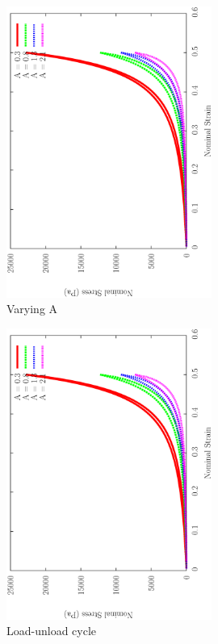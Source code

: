 \begin{figure}[!hpt]
\centering
\includegraphics[angle=270,width=0.6\textwidth]{images/examples/lagrangian/cyclic/parametric-study}
\caption{Varying A}
\label{parametric-study}
\end{figure}

\begin{figure}[!hpt]
\centering
\includegraphics[angle=270,width=0.6\textwidth]{images/examples/lagrangian/cyclic/parametric-study}
\caption{Load-unload cycle}
\label{cyclic-load}
\end{figure}


